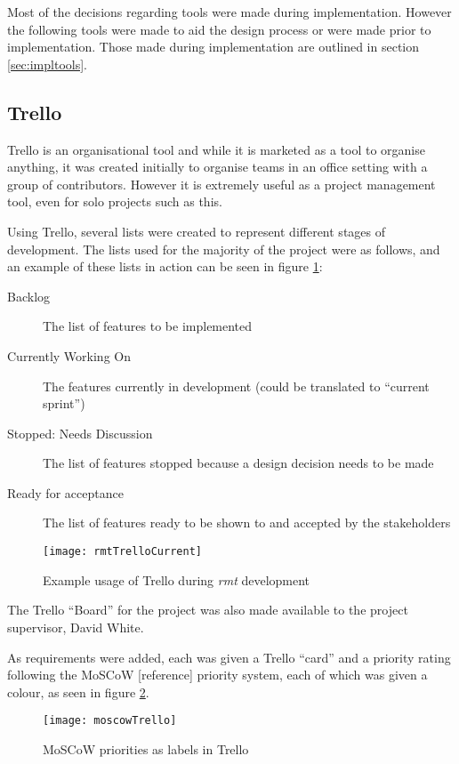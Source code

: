 Most of the decisions regarding tools were made during implementation.
However the following tools were made to aid the design process or were made prior to implementation.
Those made during implementation are outlined in section \ref{sec:impltools}.

\subsection{Trello}
\label{sec:trello}
Trello \citep{trello} is an organisational tool and while it is marketed as a tool to organise anything, it was created initially to organise teams in an office setting \citep{trellolaunch} with a group of contributors.
However it is extremely useful as a project management tool, even for solo projects such as this.

Using Trello, several lists were created to represent different stages of development.
The lists used for the majority of the project were as follows, and an example of these lists in action can be seen in figure \ref{fig:trello}:
\begin{description}
	\item[Backlog] The list of features to be implemented
	\item[Currently Working On] The features currently in development (could be translated to ``current sprint'')
	\item[Stopped: Needs Discussion] The list of features stopped because a design decision needs to be made
	\item[Ready for acceptance] The list of features ready to be shown to and accepted by the stakeholders
\end{description}

\begin{figure}[t]
	\centering
	\texttt{[image: rmtTrelloCurrent]}
	\caption{Example usage of Trello during \emph{rmt} development}
	\label{fig:trello}
\end{figure}

The Trello ``Board'' for the project was also made available to the project supervisor, David White.

As requirements were added, each was given a Trello ``card'' and a priority rating following the MoSCoW [reference] priority system, each of which was given a colour, as seen in figure \ref{fig:moscow}.

\begin{figure}[t]
	\centering
	\texttt{[image: moscowTrello]}
	\caption{MoSCoW priorities as labels in Trello}
	\label{fig:moscow}
\end{figure}

